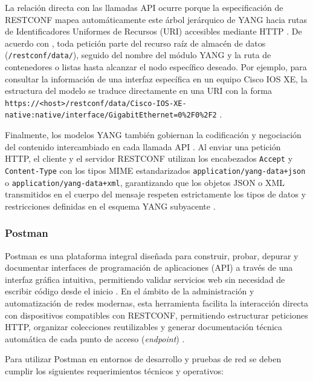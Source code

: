 \documentclass[12pt,a4paper]{article}
\begin{document}
La relación directa con las llamadas API ocurre porque la especificación de RESTCONF mapea automáticamente este árbol jerárquico de YANG hacia rutas de Identificadores Uniformes de Recursos (URI) accesibles mediante HTTP \parencite{cisco_restconf, granderath2023}. De acuerdo con \textcite{cisco_restconf}, toda petición parte del recurso raíz de almacén de datos (\texttt{/restconf/data/}), seguido del nombre del módulo YANG y la ruta de contenedores o listas hasta alcanzar el nodo específico deseado. Por ejemplo, para consultar la información de una interfaz específica en un equipo Cisco IOS XE, la estructura del modelo se traduce directamente en una URI con la forma \\ \texttt{https://<host>/restconf/data/Cisco-IOS-XE-native:native/interface/GigabitEthernet=0\%2F0\%2F2} \parencite{cisco_restconf}.

Finalmente, los modelos YANG también gobiernan la codificación y negociación del contenido intercambiado en cada llamada API \parencite{cisco_restconf, granderath2023}. Al enviar una petición HTTP, el cliente y el servidor RESTCONF utilizan los encabezados \texttt{Accept} y \texttt{Content-Type} con los tipos MIME estandarizados \texttt{application/yang-data+json} o \texttt{application/yang-data+xml}, garantizando que los objetos JSON o XML transmitidos en el cuerpo del mensaje respeten estrictamente los tipos de datos y restricciones definidas en el esquema YANG subyacente \parencite{cisco_restconf, granderath2023}.

\subsubsection{Postman}

Postman es una plataforma integral diseñada para construir, probar, depurar y documentar interfaces de programación de aplicaciones (API) a través de una interfaz gráfica intuitiva, permitiendo validar servicios web sin necesidad de escribir código desde el inicio \parencite{postman_product, geeksforgeeks_postman}. En el ámbito de la administración y automatización de redes modernas, esta herramienta facilita la interacción directa con dispositivos compatibles con RESTCONF, permitiendo estructurar peticiones HTTP, organizar colecciones reutilizables y generar documentación técnica automática de cada punto de acceso (\textit{endpoint}) \parencite{postman_docs, freecodecamp_postman}.

Para utilizar Postman en entornos de desarrollo y pruebas de red se deben cumplir los siguientes requerimientos técnicos y operativos:
\end{document}
